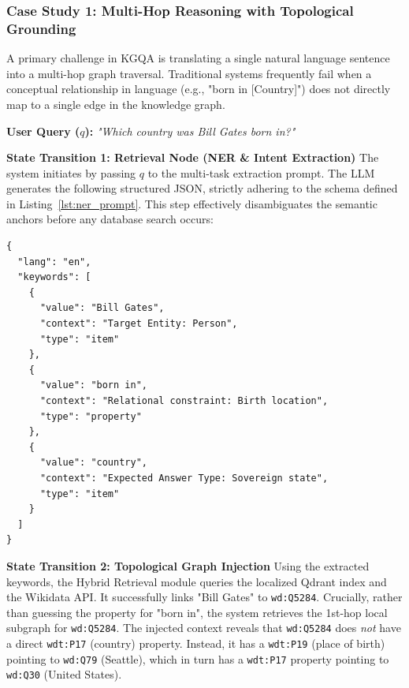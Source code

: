 \subsubsection{Case Study 1: Multi-Hop Reasoning with Topological Grounding}
A primary challenge in KGQA is translating a single natural language sentence into a multi-hop graph traversal. Traditional systems frequently fail when a conceptual relationship in language (e.g., "born in [Country]") does not directly map to a single edge in the knowledge graph. 

\textbf{User Query ($q$):} \textit{"Which country was Bill Gates born in?"}

\textbf{State Transition 1: Retrieval Node (NER \& Intent Extraction)}
The system initiates by passing $q$ to the multi-task extraction prompt. The LLM generates the following structured JSON, strictly adhering to the schema defined in Listing~\ref{lst:ner_prompt}. This step effectively disambiguates the semantic anchors before any database search occurs:

\noindent
\begin{minipage}{\textwidth}
\begin{lstlisting}[basicstyle=\ttfamily\footnotesize, frame=single, caption={NER and Intent Extraction Output. The LLM successfully categorizes the keywords into items and properties as dictated by the prompt.}, label={lst:ner_output}]
{
  "lang": "en",
  "keywords": [
    {
      "value": "Bill Gates",
      "context": "Target Entity: Person",
      "type": "item"
    },
    {
      "value": "born in",
      "context": "Relational constraint: Birth location",
      "type": "property"
    },
    {
      "value": "country",
      "context": "Expected Answer Type: Sovereign state",
      "type": "item"
    }
  ]
}
\end{lstlisting}
\end{minipage}

\textbf{State Transition 2: Topological Graph Injection}
Using the extracted keywords, the Hybrid Retrieval module queries the localized Qdrant index and the Wikidata API. It successfully links "Bill Gates" to \texttt{wd:Q5284}. Crucially, rather than guessing the property for "born in", the system retrieves the 1st-hop local subgraph for \texttt{wd:Q5284}. The injected context reveals that \texttt{wd:Q5284} does \textit{not} have a direct \texttt{wdt:P17} (country) property. Instead, it has a \texttt{wdt:P19} (place of birth) pointing to \texttt{wd:Q79} (Seattle), which in turn has a \texttt{wdt:P17} property pointing to \texttt{wd:Q30} (United States).

